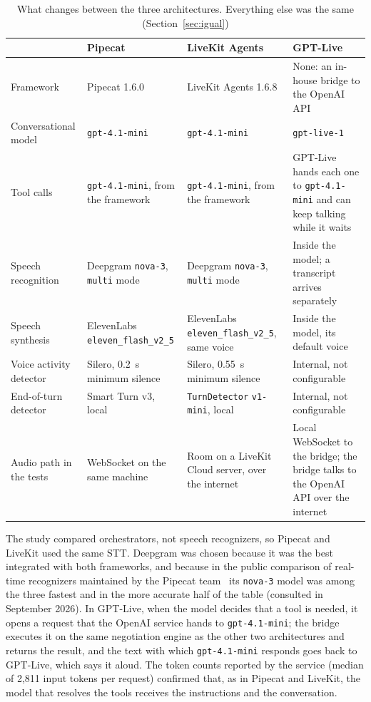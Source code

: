 \documentclass[11pt]{article}
\newcommand{\botrule}{\bottomrule}
\newcommand{\RCensoTokensMed}{2{,}811}
\begin{document}
\begin{table}[htbp]
\caption{What changes between the three architectures. Everything else was the same
(Section~\ref{sec:igual})}\label{tab:arq}
\renewcommand{\arraystretch}{1.15}
\begin{tabularx}{\linewidth}{@{}P{2.3cm}YYY@{}}
\toprule
& \textbf{Pipecat} & \textbf{LiveKit Agents} & \textbf{GPT-Live}\\
\midrule
Framework & Pipecat 1.6.0 & LiveKit Agents 1.6.8 & None: an in-house bridge to the OpenAI API\\
Conversational model & \texttt{gpt-4.1-mini} & \texttt{gpt-4.1-mini} & \texttt{gpt-live-1}\\
Tool calls & \texttt{gpt-4.1-mini}, from the framework & \texttt{gpt-4.1-mini}, from the framework & GPT-Live hands each one to \texttt{gpt-4.1-mini} and can keep talking while it waits\\
Speech recognition & Deepgram \texttt{nova-3}, \texttt{multi} mode & Deepgram \texttt{nova-3}, \texttt{multi} mode & Inside the model; a transcript arrives separately\\
Speech synthesis & ElevenLabs \texttt{eleven\_flash\_v2\_5} & ElevenLabs \texttt{eleven\_flash\_v2\_5}, same voice & Inside the model, its default voice\\
Voice activity detector & Silero, 0.2~s minimum silence & Silero, 0.55~s minimum silence & Internal, not configurable\\
End-of-turn detector & Smart Turn v3, local & \texttt{TurnDetector} \texttt{v1-mini}, local & Internal, not configurable\\
Audio path in the tests & WebSocket on the same machine & Room on a LiveKit Cloud server, over the internet & Local WebSocket to the bridge; the bridge talks to the OpenAI API over the internet\\
\botrule
\end{tabularx}
\end{table}

The study compared orchestrators, not speech recognizers, so Pipecat and LiveKit used the same STT. Deepgram was chosen because it was the best integrated with both
frameworks, and because in the public comparison of real-time recognizers maintained
by the Pipecat team~\cite{sttbenchmark} its \texttt{nova-3} model was among the three
fastest and in the more accurate half of the table (consulted in September 2026). In
GPT-Live, when the model decides that a tool is needed, it opens a request that the OpenAI
service hands to \texttt{gpt-4.1-mini}; the bridge executes it on the same negotiation
engine as the other two architectures and returns the result, and the text with which
\texttt{gpt-4.1-mini} responds goes back to GPT-Live, which says it aloud. The token
counts reported by the service (median of \RCensoTokensMed{} input tokens per
request) confirmed that, as in Pipecat and LiveKit, the model that resolves the tools
receives the instructions and the conversation.
\end{document}
